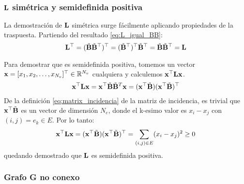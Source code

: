 \documentclass{article}
\begin{document}
\subsubsection{$\mathbf{L}$ simétrica y semidefinida positiva}

La demostración de $\mathbf{L}$ simétrica surge fácilmente aplicando propiedades de la traspuesta. Partiendo del resultado \eqref{eq:L_igual_BB}:
\begin{equation}
    \mathbf{L}^\top = (\tilde{\mathbf{B}}\tilde{\mathbf{B}}^\top)^\top = (\tilde{\mathbf{B}}^\top)^\top \tilde{\mathbf{B}}^\top = \tilde{\mathbf{B}}\tilde{\mathbf{B}}^\top = \mathbf{L}
\end{equation}

Para demostrar que es semidefinida positiva, tomemos un vector $\mathbf{x} = [x_1, x_2, \dots, x_{N_v}]^\top \in \mathbb{R}^{N_v}$
cualquiera y calculemos $\mathbf{x}^\top\mathbf{L}\mathbf{x}$.
\begin{equation*}
    \mathbf{x}^\top\mathbf{L}\mathbf{x} = \mathbf{x}^\top \tilde{\mathbf{B}}\tilde{\mathbf{B}}^T\mathbf{x} = (\mathbf{x}^\top\tilde{\mathbf{B}})(\mathbf{x}^\top\tilde{\mathbf{B}})^\top
\end{equation*}
De la definición \eqref{eq:matrix_incidencia} de la matriz de incidencia, es trivial que $\mathbf{x}^\top \tilde{\mathbf{B}}$ es un vector de dimensión $N_e$, donde el k-esimo valor es $x_i-x_j$ con $(i,j) = e_k \in E$.  Por lo tanto:
\begin{equation}
    \mathbf{x}^\top\mathbf{L}\mathbf{x} = (\mathbf{x}^\top\tilde{\mathbf{B}})(\mathbf{x}^\top\tilde{\mathbf{B}})^\top = \sum_{(i,j)\in E} (x_i-x_j)^2 \geq 0
\end{equation}
quedando demostrado que $\mathbf{L}$ es semidefinida positiva.

\subsubsection{Grafo G no conexo}
\end{document}

